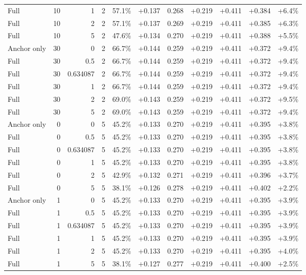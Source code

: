 \begin{table}[htbp]
\begin{tabular}{lrrrccccccc}
Full & 10 & 1 & 2 & 57.1\% & +0.137 & 0.268 & +0.219 & +0.411 & +0.384 & +6.4\% \\
Full & 10 & 2 & 2 & 57.1\% & +0.137 & 0.269 & +0.219 & +0.411 & +0.385 & +6.3\% \\
Full & 10 & 5 & 2 & 47.6\% & +0.134 & 0.270 & +0.219 & +0.411 & +0.388 & +5.5\% \\
Anchor only & 30 & 0 & 2 & 66.7\% & +0.144 & 0.259 & +0.219 & +0.411 & +0.372 & +9.4\% \\
Full & 30 & 0.5 & 2 & 66.7\% & +0.144 & 0.259 & +0.219 & +0.411 & +0.372 & +9.4\% \\
Full & 30 & 0.634087 & 2 & 66.7\% & +0.144 & 0.259 & +0.219 & +0.411 & +0.372 & +9.4\% \\
Full & 30 & 1 & 2 & 66.7\% & +0.144 & 0.259 & +0.219 & +0.411 & +0.372 & +9.4\% \\
Full & 30 & 2 & 2 & 69.0\% & +0.143 & 0.259 & +0.219 & +0.411 & +0.372 & +9.5\% \\
Full & 30 & 5 & 2 & 69.0\% & +0.143 & 0.259 & +0.219 & +0.411 & +0.372 & +9.4\% \\
Anchor only & 0 & 0 & 5 & 45.2\% & +0.133 & 0.270 & +0.219 & +0.411 & +0.395 & +3.8\% \\
Full & 0 & 0.5 & 5 & 45.2\% & +0.133 & 0.270 & +0.219 & +0.411 & +0.395 & +3.8\% \\
Full & 0 & 0.634087 & 5 & 45.2\% & +0.133 & 0.270 & +0.219 & +0.411 & +0.395 & +3.8\% \\
Full & 0 & 1 & 5 & 45.2\% & +0.133 & 0.270 & +0.219 & +0.411 & +0.395 & +3.8\% \\
Full & 0 & 2 & 5 & 42.9\% & +0.132 & 0.271 & +0.219 & +0.411 & +0.396 & +3.7\% \\
Full & 0 & 5 & 5 & 38.1\% & +0.126 & 0.278 & +0.219 & +0.411 & +0.402 & +2.2\% \\
Anchor only & 1 & 0 & 5 & 45.2\% & +0.133 & 0.270 & +0.219 & +0.411 & +0.395 & +3.9\% \\
Full & 1 & 0.5 & 5 & 45.2\% & +0.133 & 0.270 & +0.219 & +0.411 & +0.395 & +3.9\% \\
Full & 1 & 0.634087 & 5 & 45.2\% & +0.133 & 0.270 & +0.219 & +0.411 & +0.395 & +3.9\% \\
Full & 1 & 1 & 5 & 45.2\% & +0.133 & 0.270 & +0.219 & +0.411 & +0.395 & +3.9\% \\
Full & 1 & 2 & 5 & 45.2\% & +0.133 & 0.270 & +0.219 & +0.411 & +0.395 & +4.0\% \\
Full & 1 & 5 & 5 & 38.1\% & +0.127 & 0.277 & +0.219 & +0.411 & +0.400 & +2.5\% \\

\end{tabular}
\end{table}
